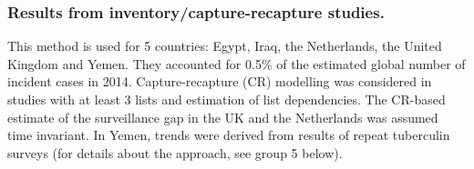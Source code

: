 \subsubsection {Results from inventory/capture-recapture studies\cite{WHO2012}.} This method is used for 5 countries: Egypt, Iraq, the Netherlands, the United Kingdom and Yemen. They accounted for 0.5\% of the estimated global number of incident cases in 2014. Capture-recapture (CR) modelling was considered in studies with at least 3 lists and estimation of list dependencies. The CR-based estimate of the surveillance gap in the UK and the Netherlands was assumed time invariant. In Yemen, trends were derived from results of repeat tuberculin surveys (for details about the approach, see group 5 below). 


